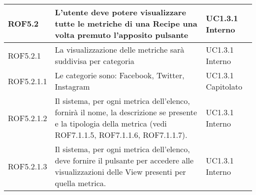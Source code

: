 \begin{center}
\begin{longtable}{| p{2.5cm} | p{8cm} | p{2cm} |}
		\hline
		ROF5.2  &  L'utente deve potere visualizzare tutte le metriche di una Recipe una volta premuto l'apposito pulsante  &  UC1.3.1 \newline Interno \\
		\hline
		ROF5.2.1  &  La visualizzazione delle metriche sarà suddivisa per categoria  &  UC1.3.1 \newline Interno \\
		\hline
		ROF5.2.1.1  &  Le categorie sono: Facebook, Twitter, Instagram &  UC1.3.1 \newline Capitolato \\		
		\hline
		ROF5.2.1.2  &  Il sistema, per ogni metrica dell'elenco, fornirà il nome, la descrizione se presente e la tipologia della metrica (vedi ROF7.1.1.5, ROF7.1.1.6, ROF7.1.1.7). &  UC1.3.1 \newline Interno \\
		\hline
		ROF5.2.1.3  &  Il sistema, per ogni metrica dell'elenco, deve fornire il pulsante per accedere alle visualizzazioni delle View presenti per quella metrica. &  UC1.3.1 \newline Interno \\
		\hline


\end{longtable}
\end{center}

